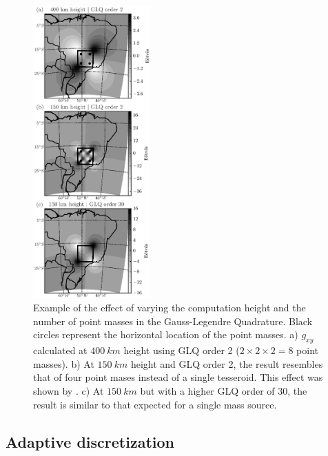 \documentclass[paper,twocolumn]{geophysics}
\begin{document}
\begin{figure}
    \centering
    \includegraphics[width=0.4\textwidth]{figs/vary-height-and-order}
    \caption{
        Example of the effect of varying
        the computation height
        and the number of point masses in the Gauss-Legendre Quadrature.
        Black circles represent the horizontal location of the point masses.
        a) $g_{xy}$ calculated at $400\ km$ height using GLQ order 2
        ($2 \times 2 \times 2 = 8$ point masses).
        b) At $150\ km$ height and GLQ order 2,
        the result resembles that of
        four point mases instead of a single tesseroid.
        This effect was shown by \citet{Ku1977}.
        c) At $150\ km$ but with a higher GLQ order of 30,
        the result is similar to that expected for a single mass source.
    }
    \label{fig:glqerrorsample}
\end{figure}


\subsection{Adaptive discretization}
\end{document}
